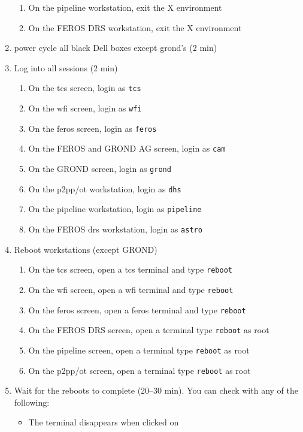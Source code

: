 \documentclass[11pt,fleqn,a4paper]{book}
\begin{document}
\begin{enumerate}
\begin{enumerate}
        \item On the pipeline workstation, exit the X environment
        \item On the FEROS DRS workstation, exit the X environment
    \end{enumerate}
\item \label{list:soft:power}\Gls{power cycle} all black Dell boxes except \gls{grond}'s (2 min) 
\item Log into all sessions (2 min)
\begin{enumerate}
    \item On the \gls{tcs} screen, login as \texttt{tcs}
    \item On the \gls{wfi} screen, login as \texttt{wfi}
    \item On the \gls{feros} screen, login as \texttt{feros}
    \item On the FEROS and GROND AG screen, login as \texttt{cam}
    \item On the GROND screen, login as \texttt{grond}
    \item On the \gls{p2pp}/\gls{ot} workstation, login as \texttt{dhs}
    \item On the pipeline workstation, login as \texttt{pipeline}
    \item On the FEROS \gls{drs} workstation, login as \texttt{astro}
\end{enumerate}
\item Reboot workstations (except GROND)
\begin{enumerate}
    \item On the \gls{tcs} screen, open a tcs terminal and type \texttt{reboot}
    \item On the \gls{wfi} screen, open a wfi terminal and type \texttt{reboot} 
    \item On the \gls{feros} screen, open a feros terminal and type \texttt{reboot}
    \item On the FEROS DRS screen, open a terminal type \texttt{reboot} as root
    \item On the pipeline screen, open a terminal type \texttt{reboot} as root
    \item On the p2pp/ot screen, open a terminal type \texttt{reboot} as root
\end{enumerate}
\item Wait for the reboots to complete (20--30 min). You can check with any of the following:
    \begin{itemize}
        \item The terminal disappears when clicked on

\end{itemize}
\end{enumerate}
\end{document}
